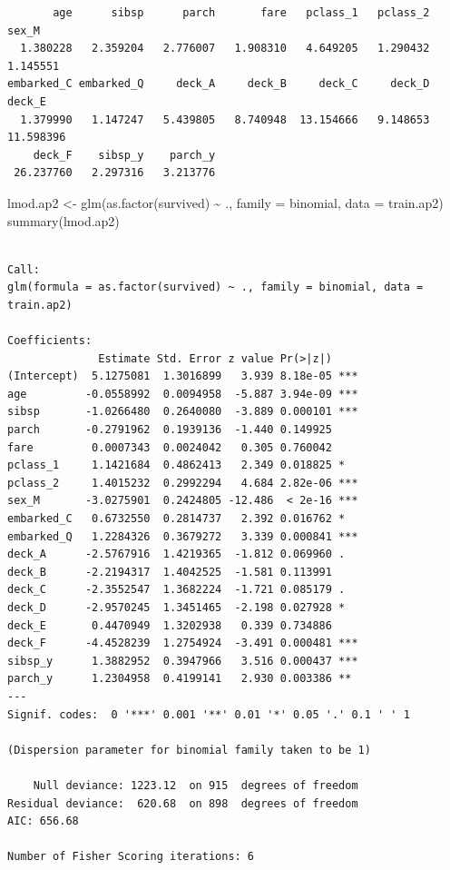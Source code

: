 \documentclass[
  letterpaper,
  DIV=11,
  numbers=noendperiod]{scrartcl}
\newenvironment{Shaded}{\begin{snugshade}}{\end{snugshade}}
\newcommand{\AttributeTok}[1]{\textcolor[rgb]{0.40,0.45,0.13}{#1}}
\newcommand{\FunctionTok}[1]{\textcolor[rgb]{0.28,0.35,0.67}{#1}}
\newcommand{\NormalTok}[1]{\textcolor[rgb]{0.00,0.23,0.31}{#1}}
\newcommand{\OtherTok}[1]{\textcolor[rgb]{0.00,0.23,0.31}{#1}}
\newcommand{\SpecialCharTok}[1]{\textcolor[rgb]{0.37,0.37,0.37}{#1}}
\begin{document}
\begin{verbatim}
       age      sibsp      parch       fare   pclass_1   pclass_2      sex_M 
  1.380228   2.359204   2.776007   1.908310   4.649205   1.290432   1.145551 
embarked_C embarked_Q     deck_A     deck_B     deck_C     deck_D     deck_E 
  1.379990   1.147247   5.439805   8.740948  13.154666   9.148653  11.598396 
    deck_F    sibsp_y    parch_y 
 26.237760   2.297316   3.213776 
\end{verbatim}

\begin{Shaded}
\begin{Highlighting}[]
\NormalTok{lmod.ap2 }\OtherTok{\textless{}{-}} \FunctionTok{glm}\NormalTok{(}\FunctionTok{as.factor}\NormalTok{(survived) }\SpecialCharTok{\textasciitilde{}}\NormalTok{ ., }\AttributeTok{family =}\NormalTok{ binomial, }\AttributeTok{data =}\NormalTok{ train.ap2)}
\FunctionTok{summary}\NormalTok{(lmod.ap2)}
\end{Highlighting}
\end{Shaded}

\begin{verbatim}

Call:
glm(formula = as.factor(survived) ~ ., family = binomial, data = train.ap2)

Coefficients:
              Estimate Std. Error z value Pr(>|z|)    
(Intercept)  5.1275081  1.3016899   3.939 8.18e-05 ***
age         -0.0558992  0.0094958  -5.887 3.94e-09 ***
sibsp       -1.0266480  0.2640080  -3.889 0.000101 ***
parch       -0.2791962  0.1939136  -1.440 0.149925    
fare         0.0007343  0.0024042   0.305 0.760042    
pclass_1     1.1421684  0.4862413   2.349 0.018825 *  
pclass_2     1.4015232  0.2992294   4.684 2.82e-06 ***
sex_M       -3.0275901  0.2424805 -12.486  < 2e-16 ***
embarked_C   0.6732550  0.2814737   2.392 0.016762 *  
embarked_Q   1.2284326  0.3679272   3.339 0.000841 ***
deck_A      -2.5767916  1.4219365  -1.812 0.069960 .  
deck_B      -2.2194317  1.4042525  -1.581 0.113991    
deck_C      -2.3552547  1.3682224  -1.721 0.085179 .  
deck_D      -2.9570245  1.3451465  -2.198 0.027928 *  
deck_E       0.4470949  1.3202938   0.339 0.734886    
deck_F      -4.4528239  1.2754924  -3.491 0.000481 ***
sibsp_y      1.3882952  0.3947966   3.516 0.000437 ***
parch_y      1.2304958  0.4199141   2.930 0.003386 ** 
---
Signif. codes:  0 '***' 0.001 '**' 0.01 '*' 0.05 '.' 0.1 ' ' 1

(Dispersion parameter for binomial family taken to be 1)

    Null deviance: 1223.12  on 915  degrees of freedom
Residual deviance:  620.68  on 898  degrees of freedom
AIC: 656.68

Number of Fisher Scoring iterations: 6
\end{verbatim}
\end{document}
